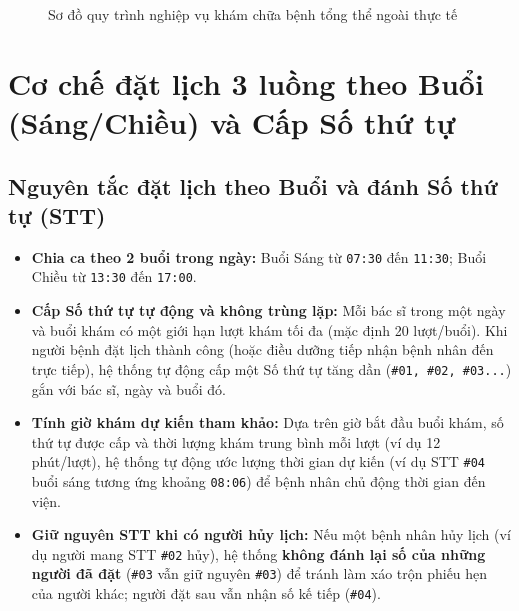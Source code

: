 \documentclass[12pt,a4paper]{report}
\begin{document}
\begin{figure}[H]
{%
  }
  \caption{Sơ đồ quy trình nghiệp vụ khám chữa bệnh tổng thể ngoài thực tế}
  \label{fig:overall-process}
\end{figure}

\section{Cơ chế đặt lịch 3 luồng theo Buổi (Sáng/Chiều) và Cấp Số thứ tự}

\subsection{Nguyên tắc đặt lịch theo Buổi và đánh Số thứ tự (STT)}
\begin{itemize}
  \item \textbf{Chia ca theo 2 buổi trong ngày:} Buổi Sáng từ \texttt{07:30} đến \texttt{11:30}; Buổi Chiều từ \texttt{13:30} đến \texttt{17:00}.
  \item \textbf{Cấp Số thứ tự tự động và không trùng lặp:} Mỗi bác sĩ trong một ngày và buổi khám có một giới hạn lượt khám tối đa (mặc định 20 lượt/buổi). Khi người bệnh đặt lịch thành công (hoặc điều dưỡng tiếp nhận bệnh nhân đến trực tiếp), hệ thống tự động cấp một Số thứ tự tăng dần (\texttt{\#01, \#02, \#03...}) gắn với bác sĩ, ngày và buổi đó.
  \item \textbf{Tính giờ khám dự kiến tham khảo:} Dựa trên giờ bắt đầu buổi khám, số thứ tự được cấp và thời lượng khám trung bình mỗi lượt (ví dụ 12 phút/lượt), hệ thống tự động ước lượng thời gian dự kiến (ví dụ STT \texttt{\#04} buổi sáng tương ứng khoảng \texttt{08:06}) để bệnh nhân chủ động thời gian đến viện.
  \item \textbf{Giữ nguyên STT khi có người hủy lịch:} Nếu một bệnh nhân hủy lịch (ví dụ người mang STT \texttt{\#02} hủy), hệ thống \textbf{không đánh lại số của những người đã đặt} (\texttt{\#03} vẫn giữ nguyên \texttt{\#03}) để tránh làm xáo trộn phiếu hẹn của người khác; người đặt sau vẫn nhận số kế tiếp (\texttt{\#04}).
\end{itemize}
\end{document}
